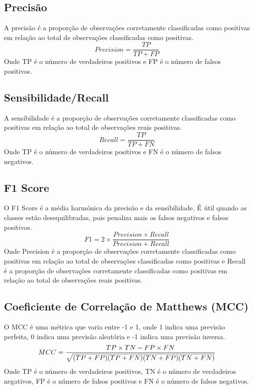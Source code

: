 \documentclass[conference]{IEEEtran}
\begin{document}
\subsection{Precisão}
A precisão é a proporção de observações corretamente classificadas como positivas em relação ao total de observações classificadas como positivas.
\begin{equation}
	Precision = \frac{TP}{TP + FP}
\end{equation}
Onde TP é o número de verdadeiros positivos e FP é o número de falsos positivos.
\subsection{Sensibilidade/Recall}
A sensibilidade é a proporção de observações corretamente classificadas como positivas em relação ao total de observações reais positivas.
\begin{equation}
	Recall = \frac{TP}{TP + FN}
\end{equation}
Onde TP é o número de verdadeiros positivos e FN é o número de falsos negativos.

\subsection{F1 Score}
O F1 Score é a média harmónica da precisão e da sensibilidade. É útil quando as classes estão desequilibradas, pois penaliza mais os falsos negativos e
falsos positivos.
\begin{equation}
	F1 = 2 \times \frac{Precision \times Recall}{Precision + Recall}
\end{equation}
Onde Precision é a proporção de observações corretamente classificadas como positivas em relação ao total de observações classificadas como positivas e Recall
é a proporção de observações corretamente classificadas como positivas em relação ao total de observações reais positivas.

\subsection{Coeficiente de Correlação de Matthews (MCC)}
O MCC é uma métrica que varia entre -1 e 1, onde 1 indica uma previsão perfeita, 0 indica uma previsão aleatória e -1 indica uma previsão inversa.
\begin{equation}
	\footnotesize
	MCC = \frac{TP \times TN - FP \times FN}{\sqrt{(TP + FP)(TP + FN)(TN + FP)(TN + FN)}}
\end{equation}
Onde TP é o número de verdadeiros positivos, TN é o número de verdadeiros negativos, FP é o número de falsos positivos e FN é o número de falsos negativos.
\end{document}
